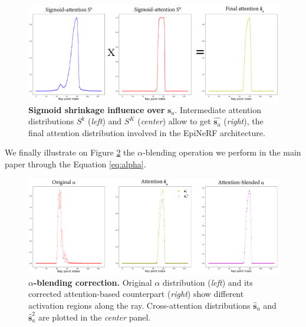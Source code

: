 \begin{figure}[h!]
    \begin{center}
  \includegraphics[width=\linewidth]{images/epinerf/SUPP_ATT_OVERLEAF.png}
  \caption{\textbf{Sigmoid shrinkage influence over} $\textbf{s}_{a}$. Intermediate attention distributions $S^{k}$ (\textit{left}) and $S^{K}$ (\textit{center}) allow to get $\hat{\mathbf{s}_{a}}$ (\textit{right}), the final attention distribution involved in the EpiNeRF architecture.}
  \label{fig:attention_sigmoid}
  \end{center}
\end{figure}

We finally illustrate on Figure \ref{fig:attention_construction} the $\alpha$-blending operation we perform in the main paper through the Equation \ref{eq:alpha}. 

\begin{figure}[h!]
    \begin{center}
  \includegraphics[width=\linewidth]{images/epinerf/SUPP_BLENDED_OVERLEAF.png}
  \caption{$\alpha$\textbf{-blending correction.} Original $\alpha$ distribution (\textit{left}) and its corrected attention-based counterpart (\textit{right}) show different activation regions along the ray. Cross-attention distributions $\hat{\textbf{s}}_{a}$ and $\hat{\textbf{s}}_{a}^{2}$ are plotted in the \textit{center} panel.}
  \label{fig:attention_construction}
  \end{center}
\end{figure}

